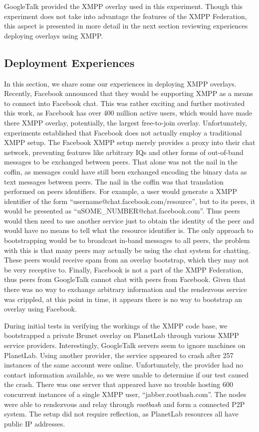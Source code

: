 \documentclass[conference]{IEEEtran}
\begin{document}
GoogleTalk provided the XMPP overlay used in this experiment.  Though this
experiment does not take into advantage the features of the XMPP Federation,
this aspect is presented in more detail in the next section reviewing
experiences deploying overlays using XMPP.

\subsection{Deployment Experiences}

In this section, we share some our experiences in deploying XMPP overlays.
Recently, Facebook announced that they would be supporting XMPP as a means to
connect into Facebook chat.  This was rather exciting and further motivated
this work, as Facebook has over 400 million active users, which would have made
there XMPP overlay, potentially, the largest free-to-join overlay.
Unfortunately, experiments established that Facebook does not actually employ a
traditional XMPP setup.  The Facebook XMPP setup merely provides a proxy into
their chat network, preventing features like arbitrary IQs and other forms of
out-of-band messages to be exchanged between peers.  That alone was not the
nail in the coffin, as messages could have still been exchanged encoding the
binary data as text messages between peers.  The nail in the coffin was that
translation performed on peers identifiers.  For example, a user would generate
a XMPP identifier of the form ``username@chat.facebook.com/resource'', but to
its peers, it would be presented as ``uSOME\_NUMBER@chat.facebook.com''.  Thus
peers would then need to use another service just to obtain the identity of the
peer and would have no means to tell what the resource identifier is.  The only
approach to bootstrapping would be to broadcast in-band messages to all peers,
the problem with this is that many peers may actually be using the chat system
for chatting.  These peers would receive spam from an overlay bootstrap, which
they may not be very receptive to.  Finally, Facebook is not a part of the XMPP
Federation, thus peers from GoogleTalk cannot chat with peers from Facebook.
Given that there was no way to exchange arbitrary information and the
rendezvous service was crippled, at this point in time, it appears there is no
way to bootstrap an overlay using Facebook.

During initial tests in verifying the workings of the XMPP code base, we
bootstrapped a  private Brunet overlay on PlanetLab through various XMPP
service providers.  Interestingly, GoogleTalk servers seem to ignore machines
on PlanetLab.  Using another provider, the service appeared to crash after 257
instances of the same account were online.  Unfortunately, the provider had no
contact information available, so we were unable to determine if our test
caused the crash.  There was one server that appeared have no trouble hosting
600 concurrent instances of a single XMPP user, ``jabber.rootbash.com''.  The
nodes were able to rendezvous and relay through \textit{rootbash} and form a
connected P2P system.  The setup did not require reflection, as PlanetLab
resources all have public IP addresses.
\end{document}
